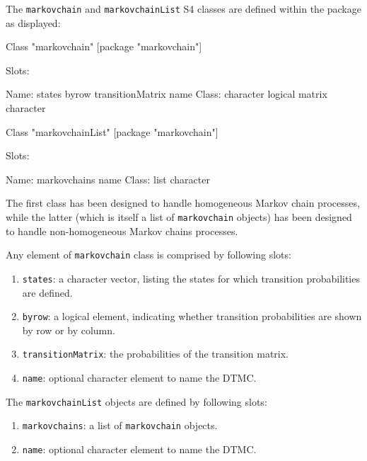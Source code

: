 \documentclass[
  nojss]{jss}
\providecommand{\tightlist}{%
  \setlength{\itemsep}{0pt}\setlength{\parskip}{0pt}}
\begin{document}
The \texttt{markovchain} and \texttt{markovchainList} S4 classes \citep{chambers} are defined within the  package as displayed:

\begin{CodeChunk}

\begin{CodeOutput}
Class "markovchain" [package "markovchain"]

Slots:
                                                                          
Name:            states            byrow transitionMatrix             name
Class:        character          logical           matrix        character
\end{CodeOutput}

\begin{CodeOutput}
Class "markovchainList" [package "markovchain"]

Slots:
                                
Name:  markovchains         name
Class:         list    character
\end{CodeOutput}
\end{CodeChunk}

The first class has been designed to handle homogeneous Markov chain processes, while the latter (which is itself a list of \texttt{markovchain} objects) has been designed to handle non-homogeneous Markov chains processes.

Any element of \texttt{markovchain} class is comprised by following slots:

\begin{enumerate}
\def\labelenumi{\arabic{enumi}.}
\tightlist
\item
  \texttt{states}: a character vector, listing the states for which transition probabilities are defined.
\item
  \texttt{byrow}: a logical element, indicating whether transition probabilities are shown by row or by column.
\item
  \texttt{transitionMatrix}: the probabilities of the transition matrix.
\item
  \texttt{name}: optional character element to name the DTMC.
\end{enumerate}

The \texttt{markovchainList} objects are defined by following slots:

\begin{enumerate}
\def\labelenumi{\arabic{enumi}.}
\tightlist
\item
  \texttt{markovchains}: a list of \texttt{markovchain} objects.
\item
  \texttt{name}: optional character element to name the DTMC.
\end{enumerate}
\end{document}
